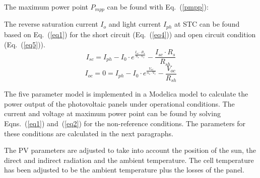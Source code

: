 

The maximum power point $P_{mpp}$ can be found with Eq.~(\ref{pmpp}):

The reverse saturation current $I_{o}$ and light current $I_{ph}$ at STC can be found based on Eq.~(\ref{eq1}) for the short circuit (Eq.~(\ref{eq4})) and open circuit condition (Eq.~(\ref{eq5})).
\begin{equation}
I_{sc} = I_{ph} - I_{0} \cdot e^{\frac{I_{sc} \cdot R_{s}}{n_{s} \cdot V_{t}}} - \frac{I_{sc} \cdot R_{s}}{R_{sh}}
\label{eq4}
\end{equation}
\begin{equation}
I_{oc} = 0 = I_{ph} - I_{0} \cdot e^{\frac{V_{oc}}{n_{s} \cdot V_{t}}} - \frac{V_{oc}}{R_{sh}}
\label{eq5}
\end{equation}

The five parameter model is implemented in a Modelica model to calculate the power output of the photovoltaic panels under operational conditions. The current and voltage at maximum power point can be found by solving Eqns.~(\ref{eq1}) and~(\ref{eq2}) for the non-reference conditions. The parameters for these conditions are calculated in the next paragraphs.

The PV parameters are adjusted to take into account the position of the sun, the direct and indirect radiation and the ambient temperature. The cell temperature has been adjusted to be the ambient temperature plus the losses of the panel.


